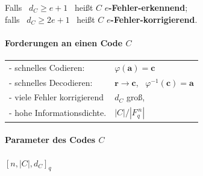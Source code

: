 \begin{definition}
Falls \ $d_C \geq e + 1$ \ heißt $C$ \textbf{$e$-Fehler-erkennend};\\
falls \ $d_C \geq 2e + 1$ \ heißt $C$ \textbf{$e$-Fehler-korrigierend}.
\end{definition}

\paragraph{Forderungen an einen Code $C$}
\begin{tabular}{ll}
- schnelles Codieren: & $\varphi(\mathbf{a}) = \mathbf{c}$ \\
- schnelles Decodieren: & $\mathbf{r} \to \mathbf{c}$, \ $\varphi^{-1}(\mathbf{c}) = \mathbf{a}$ \\
- viele Fehler korrigierend & $d_C$ groß, \\
- hohe Informationsdichte. & $|C| / |F_q^{\,n}|$ \\
\end{tabular}

\paragraph{Parameter des Codes $C$} \qquad $[n, |C|, d_C]_q$

